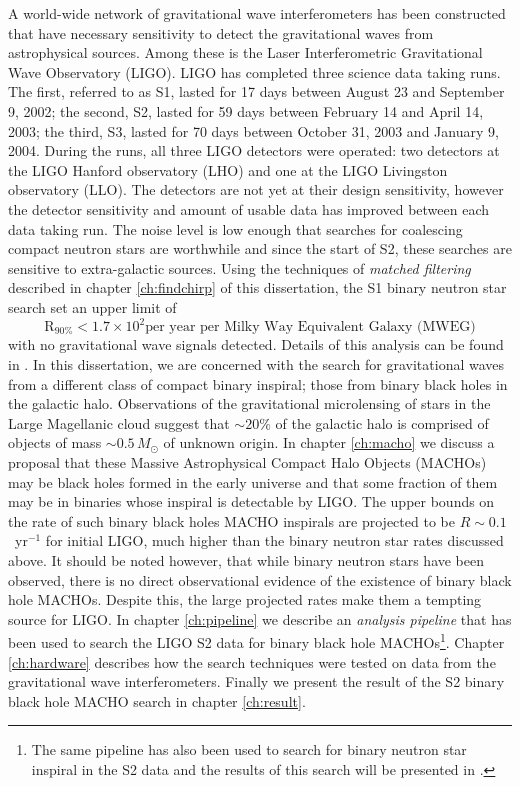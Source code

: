 A world-wide network of gravitational wave interferometers has been
constructed that have necessary sensitivity to detect the gravitational
waves from astrophysical sources. Among these is the Laser Interferometric
Gravitational Wave Observatory (LIGO)\cite{Barish:1999}. LIGO has completed
three science data taking runs. The first, referred to as S1, lasted for 17
days between August 23 and September 9, 2002; the second, S2, lasted for 59
days between February 14 and April 14, 2003; the third, S3, lasted for 70 days
between October 31, 2003 and January 9, 2004.  During the runs, all three LIGO
detectors were operated: two detectors at the LIGO Hanford observatory (LHO)
and one at the LIGO Livingston observatory (LLO).  The detectors are not yet
at their design sensitivity, however the detector sensitivity and amount of
usable data has improved between each data taking run. The noise level is low
enough that searches for coalescing compact neutron stars are worthwhile and
since the start of S2, these searches are sensitive to extra-galactic sources.
Using the techniques of \emph{matched filtering} described in chapter
\ref{ch:findchirp} of this dissertation, the S1 binary neutron star search set
an upper limit of
\begin{equation}
\mathrm{R}_{90\%} < 1.7 \times 10^2 \textrm{per year per Milky Way Equivalent Galaxy (MWEG)}
\end{equation}
with no gravitational wave signals detected. Details of this analysis can be
found in \cite{LIGOS1iul}. In this dissertation, we are concerned with the
search for gravitational waves from a different class of compact binary
inspiral; those from binary black holes in the galactic halo. Observations of
the gravitational microlensing of stars in the Large Magellanic cloud suggest
that $\sim 20\%$ of the galactic halo is comprised of objects of mass $\sim
0.5\,M_\odot$ of unknown origin. In chapter \ref{ch:macho} we discuss a
proposal that these Massive Astrophysical Compact Halo Objects (MACHOs) may be
black holes formed in the early universe and that some fraction of them may be
in binaries whose inspiral is detectable by LIGO\cite{Nakamura:1997sm}.  The
upper bounds on the rate of such binary black holes MACHO inspirals are
projected to be $R \sim 0.1$~yr$^{-1}$ for initial LIGO, much higher than the
binary neutron star rates discussed above. It should be noted however, that
while binary neutron stars have been observed, there is no direct
observational evidence of the existence of binary black hole MACHOs. Despite
this, the large projected rates make them a tempting source for LIGO. In
chapter \ref{ch:pipeline} we describe an \emph{analysis pipeline} that has
been used to search the LIGO S2 data for binary black hole MACHOs\footnote{The
same pipeline has also been used to search for binary neutron star inspiral in
the S2 data and the results of this search will be presented in
\cite{LIGOS2iul}.}. Chapter \ref{ch:hardware} describes how the search
techniques were tested on data from the gravitational wave interferometers.
Finally we present the result of the S2 binary black hole MACHO search in
chapter \ref{ch:result}. 
